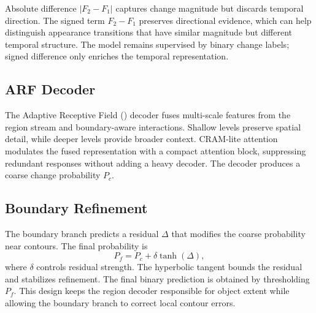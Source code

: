 Absolute difference $|F_2-F_1|$ captures change magnitude but discards temporal direction. The signed term $F_2-F_1$ preserves directional evidence, which can help distinguish appearance transitions that have similar magnitude but different temporal structure. The model remains supervised by binary change labels; signed difference only enriches the temporal representation.

\subsection{ARF Decoder}

The Adaptive Receptive Field (\arf) decoder fuses multi-scale features from the region stream and boundary-aware interactions. Shallow levels preserve spatial detail, while deeper levels provide broader context. CRAM-lite attention modulates the fused representation with a compact attention block, suppressing redundant responses without adding a heavy decoder. The decoder produces a coarse change probability $P_c$.

\subsection{Boundary Refinement}

The boundary branch predicts a residual $\Delta$ that modifies the coarse probability near contours. The final probability is
\begin{equation}
P_f = P_c + \delta \tanh(\Delta),
\label{eq:boundary_refine}
\end{equation}
where $\delta$ controls residual strength. The hyperbolic tangent bounds the residual and stabilizes refinement. The final binary prediction is obtained by thresholding $P_f$. This design keeps the region decoder responsible for object extent while allowing the boundary branch to correct local contour errors.
